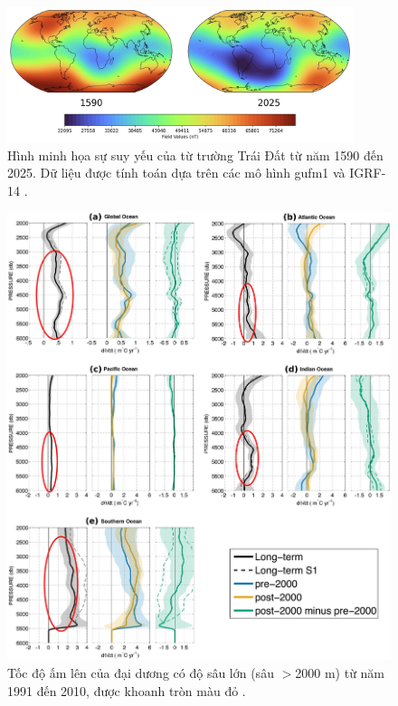 \documentclass[10pt,twocolumn,letterpaper]{article}
\begin{document}
\begin{figure}[t]
\begin{center}
\includegraphics[width=0.9\textwidth]{saa.jpg}
\end{center}
   \caption{Hình minh họa sự suy yếu của từ trường Trái Đất từ năm 1590 đến 2025. Dữ liệu được tính toán dựa trên các mô hình gufm1 và IGRF-14 \cite{125,126}.}
\label{fig:14}
\end{figure}

\begin{figure}[t]
\begin{center}
   \includegraphics[width=1\linewidth]{ocean-highlight.jpg}
\end{center}
   \caption{Tốc độ ấm lên của đại dương có độ sâu lớn (sâu $>$2000 m) từ năm 1991 đến 2010, được khoanh tròn màu đỏ \cite{132}.}
\label{fig:15}
\label{fig:onecol}
\end{figure}
\end{document}
